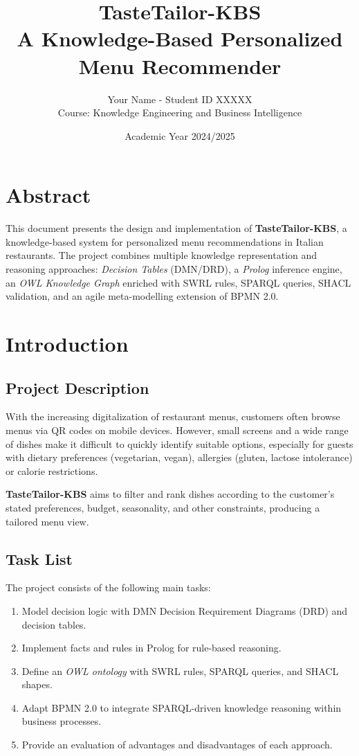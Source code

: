 \documentclass[a4paper,12pt]{article}
\title{TasteTailor-KBS \\ \large A Knowledge-Based Personalized Menu Recommender}
\author{Your Name - Student ID XXXXX \\
Course: Knowledge Engineering and Business Intelligence}
\date{Academic Year 2024/2025}
\begin{document}
\maketitle

\section*{Abstract}
This document presents the design and implementation of \textbf{TasteTailor-KBS}, a knowledge-based system for personalized menu recommendations in Italian restaurants.  
The project combines multiple knowledge representation and reasoning approaches: \textit{Decision Tables} (DMN/DRD), a \textit{Prolog} inference engine, an \textit{OWL Knowledge Graph} enriched with SWRL rules, SPARQL queries, SHACL validation, and an agile meta-modelling extension of BPMN 2.0.  

\tableofcontents

\section{Introduction}
\subsection{Project Description}
With the increasing digitalization of restaurant menus, customers often browse menus via QR codes on mobile devices.  
However, small screens and a wide range of dishes make it difficult to quickly identify suitable options, especially for guests with dietary preferences (vegetarian, vegan), allergies (gluten, lactose intolerance) or calorie restrictions.  

\textbf{TasteTailor-KBS} aims to filter and rank dishes according to the customer's stated preferences, budget, seasonality, and other constraints, producing a tailored menu view.

\subsection{Task List}
The project consists of the following main tasks:
\begin{enumerate}
    \item Model decision logic with DMN Decision Requirement Diagrams (DRD) and decision tables.
    \item Implement facts and rules in Prolog for rule-based reasoning.
    \item Define an \textit{OWL ontology} with SWRL rules, SPARQL queries, and SHACL shapes.
    \item Adapt BPMN 2.0 to integrate SPARQL-driven knowledge reasoning within business processes.
    \item Provide an evaluation of advantages and disadvantages of each approach.
\end{enumerate}
\end{document}
